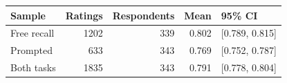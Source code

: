 
\begin{tabular}{lrrrl}
\toprule
Sample & Ratings & Respondents & Mean & 95\% CI\\
\midrule
Free recall & 1202 & 339 & 0.802 & {}[0.789, 0.815]\\
Prompted & 633 & 343 & 0.769 & {}[0.752, 0.787]\\
Both tasks & 1835 & 343 & 0.791 & {}[0.778, 0.804]\\
\bottomrule
\end{tabular}
